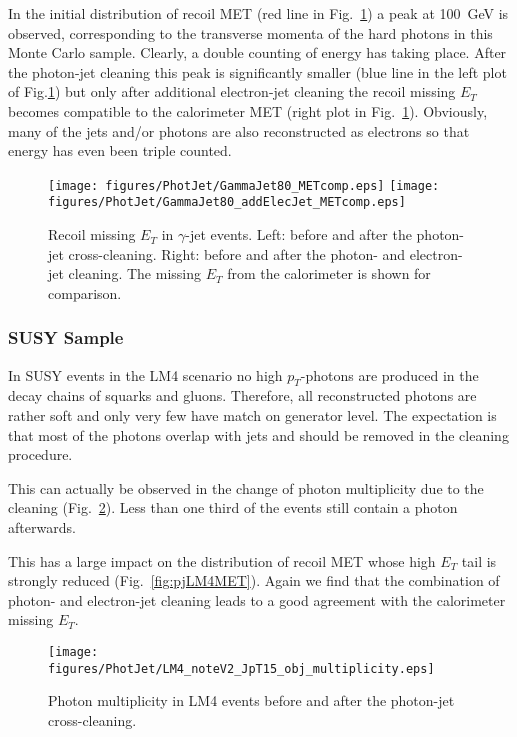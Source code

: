 \documentclass{cmspaper}
\begin{document}
In the initial distribution of recoil MET (red line in
Fig.~\ref{fig:pjMET}) a peak at 100\ GeV is observed, corresponding to the
transverse momenta of the hard photons in this Monte Carlo sample. Clearly, a
double counting of energy has taking place.  After the photon-jet cleaning this
peak is significantly smaller (blue line in the left plot of
Fig.\ref{fig:pjMET}) but only after additional electron-jet cleaning the
recoil missing $E_T$ becomes compatible to the calorimeter MET (right plot in
Fig.~\ref{fig:pjMET}). Obviously, many of the jets and/or photons are
also reconstructed as electrons so that energy has even been triple counted.
\begin{figure}[hbtp]
  \begin{center}
    \texttt{[image: figures/PhotJet/GammaJet80\_METcomp.eps]}
    \texttt{[image: figures/PhotJet/GammaJet80\_addElecJet\_METcomp.eps]}
    \caption{Recoil missing $E_T$ in $\gamma$-jet events. Left: before and
    after the photon-jet cross-cleaning. Right: before and after the photon-
    and electron-jet cleaning. The missing $E_T$ from the calorimeter is shown
    for comparison.}
    \label{fig:pjMET}
  \end{center}
\end{figure}

\clearpage
\subsubsection{SUSY Sample}
In SUSY events in the LM4 scenario no high $p_T$-photons are produced in the
decay chains of squarks and gluons. Therefore, all reconstructed photons are rather soft and only very
few have match on generator level. The expectation is that most of the
photons overlap with jets and should be removed in the cleaning procedure.

This can actually be observed in the change of photon multiplicity due to the
cleaning (Fig.~\ref{fig:pjLM4mult}). Less than one third of the events still
contain a photon afterwards.

This has a large impact on the distribution of recoil MET whose high $E_T$ tail
is strongly reduced (Fig.~\ref{fig:pjLM4MET}). Again we find that the
combination of photon- and electron-jet cleaning leads to a good agreement with
the calorimeter missing $E_T$.

\begin{figure}[hbtp]
  \begin{center}
      \texttt{[image: figures/PhotJet/LM4\_noteV2\_JpT15\_obj\_multiplicity.eps]}
    \caption{Photon multiplicity in LM4 events before and after the photon-jet
    cross-cleaning.}
    \label{fig:pjLM4mult}
  \end{center}
\end{figure}
\end{document}
